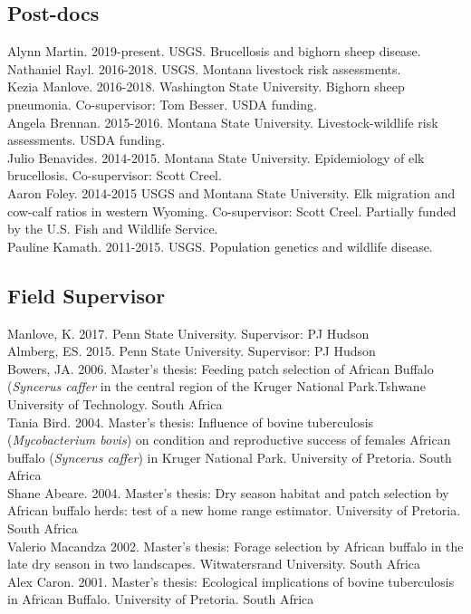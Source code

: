 \documentclass[12pt,]{article}
\begin{document}
\hypertarget{post-docs}{%
\subsection{Post-docs}\label{post-docs}}

Alynn Martin. 2019-present. USGS. Brucellosis and bighorn sheep
disease.\\
Nathaniel Rayl. 2016-2018. USGS. Montana livestock risk assessments.\\
Kezia Manlove. 2016-2018. Washington State University. Bighorn sheep
pneumonia. Co-supervisor: Tom Besser. USDA funding.\\
Angela Brennan. 2015-2016. Montana State University. Livestock-wildlife
risk assessments. USDA funding.\\
Julio Benavides. 2014-2015. Montana State University. Epidemiology of
elk brucellosis. Co-supervisor: Scott Creel.\\
Aaron Foley. 2014-2015 USGS and Montana State University. Elk migration
and cow-calf ratios in western Wyoming. Co-supervisor: Scott Creel.
Partially funded by the U.S. Fish and Wildlife Service.\\
Pauline Kamath. 2011-2015. USGS. Population genetics and wildlife
disease.

\hypertarget{field-supervisor}{%
\subsection{Field Supervisor}\label{field-supervisor}}

Manlove, K. 2017. Penn State University. Supervisor: PJ Hudson\\
Almberg, ES. 2015. Penn State University. Supervisor: PJ Hudson\\
Bowers, JA. 2006. Master's thesis: Feeding patch selection of African
Buffalo (\emph{Syncerus caffer} in the central region of the Kruger
National Park.Tshwane University of Technology. South Africa\\
Tania Bird. 2004. Master's thesis: Influence of bovine tuberculosis
(\emph{Mycobacterium bovis}) on condition and reproductive success of
females African buffalo (\emph{Syncerus caffer}) in Kruger National
Park. University of Pretoria. South Africa\\
Shane Abeare. 2004. Master's thesis: Dry season habitat and patch
selection by African buffalo herds: test of a new home range estimator.
University of Pretoria. South Africa\\
Valerio Macandza 2002. Master's thesis: Forage selection by African
buffalo in the late dry season in two landscapes. Witwatersrand
University. South Africa\\
Alex Caron. 2001. Master's thesis: Ecological implications of bovine
tuberculosis in African Buffalo. University of Pretoria. South Africa
\end{document}
